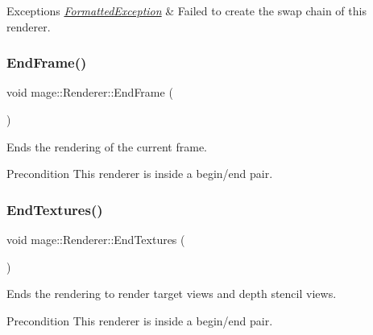 \begin{DoxyExceptions}{Exceptions}
{\em \hyperlink{structmage_1_1_formatted_exception}{Formatted\+Exception}} & Failed to create the swap chain of this renderer. \\
\hline
\end{DoxyExceptions}
\hypertarget{classmage_1_1_renderer_a38be3325e99a447340a048db19e6cf07}{}\label{classmage_1_1_renderer_a38be3325e99a447340a048db19e6cf07} 
\subsubsection{\texorpdfstring{End\+Frame()}{EndFrame()}}
{\footnotesize\ttfamily void mage\+::\+Renderer\+::\+End\+Frame (\begin{DoxyParamCaption}{ }\end{DoxyParamCaption})}

Ends the rendering of the current frame.

\begin{DoxyPrecond}{Precondition}
This renderer is inside a begin/end pair. 
\end{DoxyPrecond}
\hypertarget{classmage_1_1_renderer_a80cfd903143b94348bc2c0c841831ff3}{}\label{classmage_1_1_renderer_a80cfd903143b94348bc2c0c841831ff3} 
\subsubsection{\texorpdfstring{End\+Textures()}{EndTextures()}}
{\footnotesize\ttfamily void mage\+::\+Renderer\+::\+End\+Textures (\begin{DoxyParamCaption}{ }\end{DoxyParamCaption})}

Ends the rendering to render target views and depth stencil views.

\begin{DoxyPrecond}{Precondition}
This renderer is inside a begin/end pair. 
\end{DoxyPrecond}
\hypertarget{classmage_1_1_renderer_a84ad465ae4ecfa2c0e9334cadb82d269}{}\label{classmage_1_1_renderer_a84ad465ae4ecfa2c0e9334cadb82d269} 
